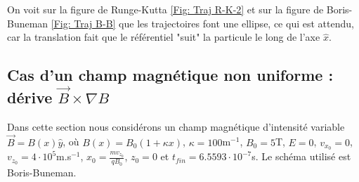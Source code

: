 \documentclass[a4paper,12pt,twoside]{article}
\begin{document}
On voit sur la figure de Runge-Kutta \ref{Fig: Traj R-K-2} et sur la figure de Boris-Buneman \ref{Fig: Traj B-B} que les trajectoires font une ellipse, ce qui est attendu, car la translation fait que le r\'ef\'erentiel "suit" la particule le long de l'axe $\hat{x}$.


\subsection{Cas d'un champ magn\'etique non uniforme : d\'erive $\Vec{B}\times\nabla B$}
Dans cette section nous consid\'erons un champ magn\'etique d'intensit\'e variable $\Vec{B} = B(x)\hat{y}$, o\`u $B(x) = B_0(1 + \kappa x)$, $\kappa = 100$m$^{-1}$, $B_0 = 5$T, $E = 0$, $v_{x_0} = 0$, $v_{z_0} = 4\cdot10^5$m.s$^{-1}$, $x_0 = \frac{mv_{z_0}}{qB_0}$, $z_0 = 0$ et $t_{fin} = 6.5593\cdot10^{-7}$s. Le sch\'ema utilis\'e est Boris-Buneman.
\end{document}
